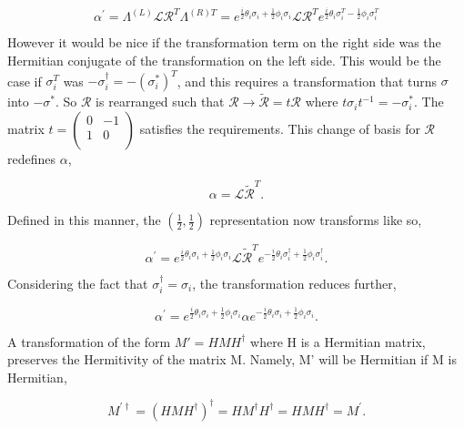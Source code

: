 \begin{equation}
\alpha^{'} = \Lambda^{(L)} \mathcal{L} \mathcal{R}^T \Lambda^{(R)T} 
 = e^{\frac{i}{2}\theta_i \sigma_i + \frac{1}{2}\phi_i \sigma_i} \mathcal{L} \mathcal{R}^T e^{\frac{i}{2}\theta_i \sigma_i^T - \frac{1}{2}\phi_i \sigma_i^T} 
\end{equation}

However it would be nice if the transformation term on the right side was the Hermitian conjugate of the transformation on the left side. This would be the case if $\sigma_i^T$ was $-\sigma_i^{\dagger} = -(\sigma_i^{*})^{T}$, and this requires a transformation that turns $\sigma$ into $-\sigma^{*}$. So $\mathcal{R}$ is rearranged such that $\mathcal{R} \rightarrow \tilde{\mathcal{R}} = t\mathcal{R}$ where $t\sigma_i t^{-1} = -\sigma_i^{*}$. The matrix $t = \left( \begin{smallmatrix} 0 & -1 \\ 1 & 0 \\ \end{smallmatrix} \right)$ satisfies the requirements. This change of basis for $\mathcal{R}$ redefines $\alpha$,

\begin{equation}
\alpha = \mathcal{L}\tilde{\mathcal{R}}^T.
\end{equation}

Defined in this manner, the $(\frac{1}{2}, \frac{1}{2})$ representation now transforms like so,

\begin{equation}
\alpha^{'} = e^{\frac{i}{2}\theta_i \sigma_i + \frac{1}{2}\phi_i \sigma_i} 
\mathcal{L}\tilde{\mathcal{R}}^T e^{-\frac{i}{2}\theta_i \sigma_i^\dagger + \frac{1}{2}\phi_i \sigma_i^\dagger}.
\end{equation}

Considering the fact that $\sigma_i^\dagger = \sigma_i$, the transformation reduces further,

\begin{equation}
\alpha^{'} = e^{\frac{i}{2}\theta_i \sigma_i + \frac{1}{2}\phi_i \sigma_i} 
\alpha e^{-\frac{i}{2}\theta_i \sigma_i + \frac{1}{2}\phi_i \sigma_i}.
\end{equation}

A transformation of the form $M' = HMH^\dagger$ where H is a Hermitian matrix, preserves the Hermitivity of the matrix M. Namely, M' will be Hermitian if M is Hermitian, 

\begin{equation}
M^{'\dagger} = (HMH^\dagger)^\dagger = HM^\dagger H^\dagger = HMH^\dagger = M^{'}.
\end{equation}

